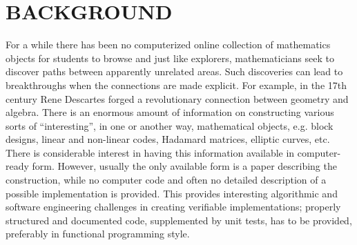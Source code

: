 \documentclass{article}
\begin{document}
\section{BACKGROUND}
For a while there has been no computerized online collection of mathematics objects for students to browse and just like explorers, mathematicians seek to discover paths between apparently unrelated areas. Such discoveries can lead to breakthroughs when the connections are made explicit. For example, in the 17th century Rene Descartes forged a revolutionary connection between geometry and algebra. 
There is an enormous amount of information on constructing various sorts of “interesting”, in one or another way, mathematical objects, e.g. block designs, linear and non-linear codes, Hadamard matrices, elliptic curves, etc.  There is considerable interest in having this information available in computer-ready form.  However, usually the only available form is a paper describing the construction, while no computer code and often no detailed description of a possible implementation is provided. This provides interesting algorithmic and software engineering challenges in creating verifiable implementations; properly structured and documented code, supplemented by unit tests, has to be provided, preferably in functional programming style. \\
\end{document}
